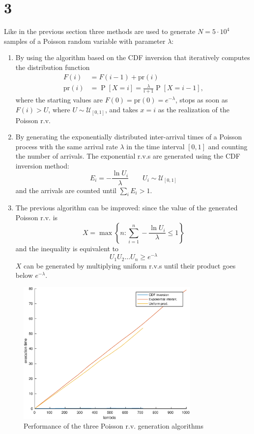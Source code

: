 \documentclass[a4paper,oneside]{article}
\newcommand{\Prob}[1]{\operatorname{P}\left[#1\right]}
\newcommand{\distr}[0]{\sim}
\newcommand{\unif}[1]{\mathcal{U}_{#1}}
\begin{document}
\section*{3}
Like in the previous section three methods are used to generate
$N=5\cdot10^4$ samples of a Poisson random variable with parameter
$\lambda$:
\begin{enumerate}
  \item By using the algorithm based on the CDF inversion that
  iteratively computes the distribution function
  \begin{align*}
    F(i) &= F(i-1) + \mathrm{pr}(i) \\
    \mathrm{pr}(i) &= \Prob{X = i} = \frac{\lambda}{i+1}\Prob{X = i-1} , 
  \end{align*}
  where the starting values are $F(0) = \mathrm{pr}(0) =
  e^{-\lambda}$, stops as soon as $F(i) > U$, where $U \distr
  \unif{[0,1]}$, and takes $x = i$ as the realization of the Poisson
  r.v.
  \item By generating the exponentially distributed inter-arrival times
    of a Poisson process with the same arrival rate $\lambda$ in the
    time interval $[0,1]$ and counting the number of arrivals. The
    exponential r.v.s are generated using the CDF inversion method:
    \[ E_i = -\frac{\ln U_i}{\lambda} \qquad U_i \distr \unif{[0,1]} \]
    and the arrivals are counted until $\sum_i E_i > 1$.
    \item The previous algorithm can be improved: since the value of
      the generated Poisson r.v. is
      \[ X = \max\left\{n: \sum_{i=1}^n -\frac{\ln U_i}{\lambda} \leq 1 \right\} \]
      and the inequality is equivalent to
      \[ U_1 U_2 \dots U_n \geq e^{-\lambda} \]
      $X$ can be generated by multiplying uniform r.v.s until their
      product goes below $e^{-\lambda}$.
\end{enumerate}
\begin{figure}[htbp]
  \centering
  \includegraphics[width=0.8\textwidth]{poisson_gen}
  \caption{Performance of the three Poisson r.v. generation algorithms}
  \label{plot:poisson}
\end{figure}
\end{document}
